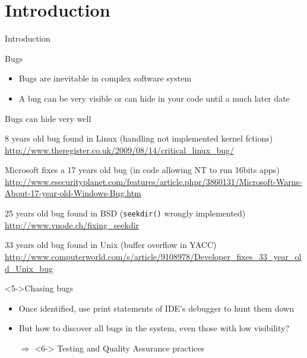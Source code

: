 \section{Introduction}
\begin{frame}[squeeze]{Introduction}
  \begin{block}{Bugs}
    \begin{itemize}
    \item Bugs are inevitable in complex software system
    \item A bug can be very visible or can hide in your code until a much later
      date
    \end{itemize}
  \end{block}\vspace{-.6\baselineskip}
  
  \begin{block}{Bugs can hide very well}
    \begin{description}
    \item[Aug 2009] \alert{8 years} old bug found in Linux 
      {\small(handling not implemented kernel fctions)}\\
      {\footnotesize\url{http://www.theregister.co.uk/2009/08/14/critical_linux_bug/}}
    \item<2->[Jan 2010] Microsoft fixes a \alert{17 years} old bug 
      {\small(in code allowing NT to run 16bits apps)}\\
      {\footnotesize\url{http://www.esecurityplanet.com/features/article.phpr/3860131/Microsoft-Warns-About-17-year-old-Windows-Bug.htm}}
    \item<3->[July 2008] \alert{25 years} old bug found in BSD 
      {\small(\texttt{seekdir()} wrongly implemented)}\\
      {\scriptsize\url{http://www.vnode.ch/fixing_seekdir}}
    \item<4->[July 2008] \alert{33 years} old bug found in Unix 
      {\small(buffer overflow in YACC)}\\
      {\scriptsize\url{http://www.computerworld.com/s/article/9108978/Developer_fixes_33_year_old_Unix_bug}}
    \end{description}
  \end{block}\vspace{-.6\baselineskip}

  \begin{block}<5->{Chasing bugs}
    \begin{itemize}
    \item Once identified, use print statements of IDE's debugger to hunt them
      down
    \item But how to discover all bugs in the system, even those with low
      visibility?
    \item[$\Rightarrow$]<6-> \alert{Testing} and Quality Assurance practices
    \end{itemize}
  \end{block}
\end{frame}
